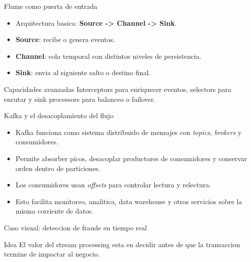 \documentclass[aspectratio=169]{beamer}
\begin{document}
\begin{frame}{Flume como puerta de entrada}
  \begin{itemize}
    \item Arquitectura basica: \textbf{Source -> Channel -> Sink}.
    \item \textbf{Source}: recibe o genera eventos.
    \item \textbf{Channel}: cola temporal con distintos niveles de persistencia.
    \item \textbf{Sink}: envia al siguiente salto o destino final.
  \end{itemize}
  \vspace{0.25cm}
  \begin{block}{Capacidades avanzadas}
    Interceptors para enriquecer eventos, selectors para enrutar y sink processors para balanceo o failover.
  \end{block}
\end{frame}

\begin{frame}{Kafka y el desacoplamiento del flujo}
  \begin{itemize}
    \item Kafka funciona como sistema distribuido de mensajes con \textit{topics}, \textit{brokers} y consumidores.
    \item Permite absorber picos, desacoplar productores de consumidores y conservar orden dentro de particiones.
    \item Los consumidores usan \textit{offsets} para controlar lectura y relectura.
    \item Esto facilita monitoreo, analitica, data warehouse y otros servicios sobre la misma corriente de datos.
  \end{itemize}
\end{frame}

\begin{frame}{Caso visual: deteccion de fraude en tiempo real}
  \centering
  \vspace{0.25cm}

  \begin{block}{Idea}
    El valor del stream processing esta en decidir antes de que la transaccion termine de impactar al negocio.
  \end{block}
\end{frame}
\end{document}
